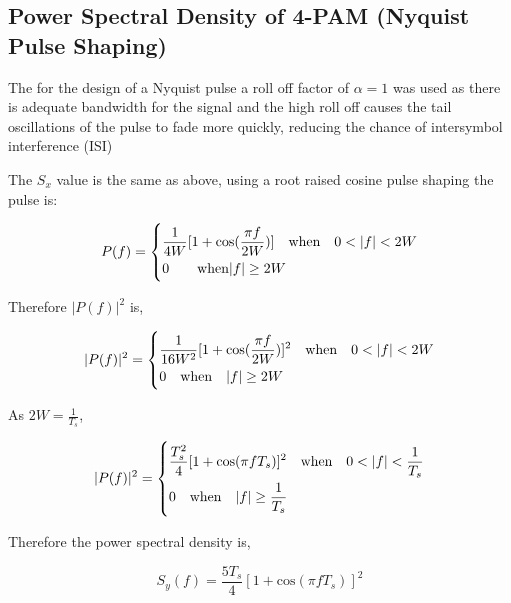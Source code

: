 \subsection{Power Spectral Density of 4-PAM (Nyquist Pulse Shaping)}
The for the design of a Nyquist pulse a roll off factor of $\alpha = 1$ was used as there is adequate bandwidth
for the signal and the high roll off causes the tail oscillations of the pulse to fade more quickly, reducing the
chance of intersymbol interference (ISI)

The $S_x$ value is the same as above, using a root raised cosine pulse shaping the pulse is:

\begin{equation}
    \label{eqn:pf-w-niquist}
    P(f) =
    \begin{dcases}
        \frac{1}{4W} [1+\textrm{cos}(\frac{\pi f}{2W})] \quad \textrm{when} \quad 0<|f|<2W \\
        0 \quad \quad \textrm{when} |f| \geq 2W
    \end{dcases}
\end{equation}

Therefore $|P(f)|^2$ is,

\begin{equation}
    \label{eqn-pf2-nyquist}
    |P(f)|^2 =
    \begin{dcases}
        \frac{1}{16W^2}[1+\textrm{cos}(\frac{\pi f}{2W})]^2 \quad \textrm{when} \quad 0<|f|<2W \\
        0 \quad \textrm{when} \quad |f| \geq 2W
    \end{dcases}
\end{equation}

As $2W = \frac{1}{T_s}$,

\begin{equation}
    \label{eqn-pf2-nyquist-ts}
    |P(f)|^2 =
    \begin{dcases}
        \frac{T_s^2}{4}[1+\textrm{cos}(\pi f T_s)]^2 \quad \textrm{when} \quad 0<|f|<\frac{1}{T_s} \\
        0 \quad \textrm{when} \quad |f| \geq \frac{1}{T_s}
    \end{dcases}
\end{equation}

Therefore the power spectral density is,

\begin{equation}
    \label{eqn:psd-nyquist}
    S_y(f) = \frac{5T_s}{4}[1+\textrm{cos}(\pi f T_s)]^2
\end{equation}

